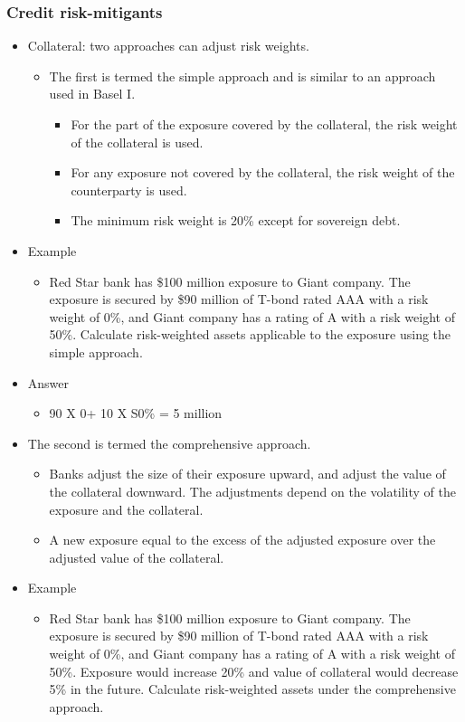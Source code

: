 \subsubsection{Credit risk-mitigants}
\begin{itemize}
\item Collateral: two approaches can adjust risk weights.
    \begin{itemize}
    \item The first is termed the simple approach and is similar to an approach used in Basel I.
        \begin{itemize}
        \item For the part of the exposure covered by the collateral, the risk weight of the collateral is used.
        \item For any exposure not covered by the collateral, the risk weight of the counterparty is used.
        \item The minimum risk weight is 20\% except for sovereign debt.
        \end{itemize}
    \end{itemize}
\item Example
    \begin{itemize}
    \item Red Star bank has \$100 million exposure to Giant company. The exposure is secured by \$90 million of T-bond rated AAA with a risk weight of 0\%, and Giant company has a rating of A with a risk weight of 50\%. Calculate risk-weighted assets applicable to the exposure using the simple approach.
    \end{itemize}
\item Answer
    \begin{itemize}
    \item 90 X 0+ 10 X S0\% = 5 million
    \end{itemize}

\item The second is termed the comprehensive approach.
    \begin{itemize}
    \item Banks adjust the size of their exposure upward, and adjust the value of the collateral downward. The adjustments depend on the volatility of the exposure and the collateral.
    \item A new exposure equal to the excess of the adjusted exposure over the adjusted value of the collateral.
    \end{itemize}
\item Example
    \begin{itemize}
    \item Red Star bank has \$100 million exposure to Giant company. The exposure is secured by \$90 million of T-bond rated AAA with a risk weight of 0\%, and Giant company has a rating of A with a risk weight of 50\%. Exposure would increase 20\% and value of collateral would decrease 5\% in the future. Calculate risk-weighted assets under the comprehensive approach.
    \end{itemize}


\end{itemize}
